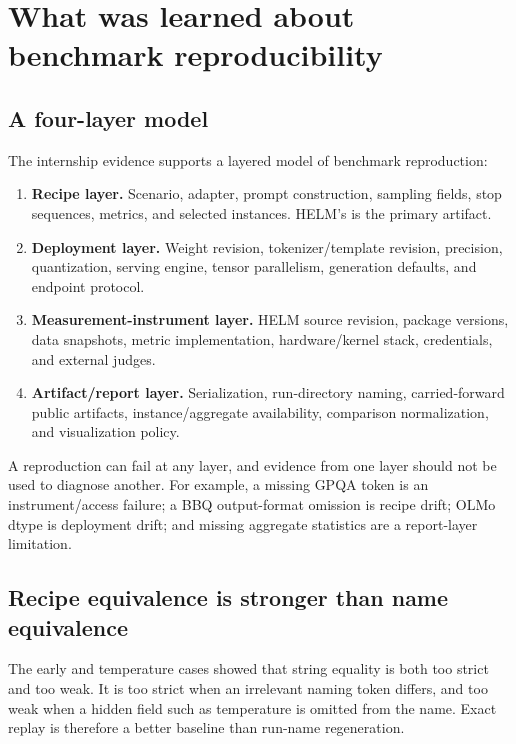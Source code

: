 \documentclass[11pt,oneside]{report}
\newcommand{\code}[1]{\texttt{\detokenize{#1}}}
\begin{document}
\chapter{What was learned about benchmark reproducibility}
\label{ch:synthesis}

\section{A four-layer model}

The internship evidence supports a layered model of benchmark reproduction:

\begin{enumerate}
  \item \textbf{Recipe layer.} Scenario, adapter, prompt construction, sampling fields, stop sequences, metrics, and selected instances. HELM's \code{run_spec.json} is the primary artifact.
  \item \textbf{Deployment layer.} Weight revision, tokenizer/template revision, precision, quantization, serving engine, tensor parallelism, generation defaults, and endpoint protocol.
  \item \textbf{Measurement-instrument layer.} HELM source revision, package versions, data snapshots, metric implementation, hardware/kernel stack, credentials, and external judges.
  \item \textbf{Artifact/report layer.} Serialization, run-directory naming, carried-forward public artifacts, instance/aggregate availability, comparison normalization, and visualization policy.
\end{enumerate}

A reproduction can fail at any layer, and evidence from one layer should not be used to diagnose another. For example, a missing GPQA token is an instrument/access failure; a BBQ output-format omission is recipe drift; OLMo dtype is deployment drift; and missing aggregate statistics are a report-layer limitation.

\section{Recipe equivalence is stronger than name equivalence}

The early \code{groups=} and temperature cases showed that string equality is both too strict and too weak. It is too strict when an irrelevant naming token differs, and too weak when a hidden field such as temperature is omitted from the name. Exact \code{run_spec.json} replay is therefore a better baseline than run-name regeneration.
\end{document}

